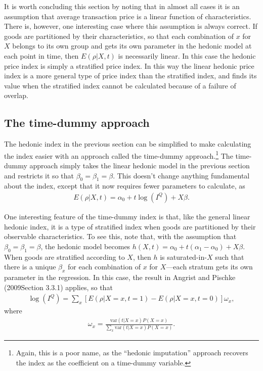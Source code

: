 \documentclass[
]{article}
\begin{document}
It is worth concluding this section by noting that in almost all cases it is an assumption that average transaction price is a linear function of characteristics. There is, however, one interesting case where this assumption is always correct. If goods are partitioned by their characteristics, so that each combination of \(x\) for \(X\) belongs to its own group and gets its own parameter in the hedonic model at each point in time, then \(E(\rho | X, t)\) is necessarily linear. In this case the hedonic price index is simply a stratified price index. In this way the linear hedonic price index is a more general type of price index than the stratified index, and finds its value when the stratified index cannot be calculated because of a failure of overlap.

\hypertarget{the-time-dummy-approach}{%
\subsection{The time-dummy approach}\label{the-time-dummy-approach}}

The hedonic index in the previous section can be simplified to make calculating the index easier with an approach called the time-dummy approach.\footnote{Again, this is a poor name, as the ``hedonic imputation'' approach recovers the index as the coefficient on a time-dummy variable.} The time-dummy approach simply takes the linear hedonic model in the previous section and restricts it so that \(\beta_{0} = \beta_{1} = \beta\). This doesn't change anything fundamental about the index, except that it now requires fewer parameters to calculate, as
\begin{align*}
E(\rho | X, t) = \alpha_{0} + t \log(I^{Q}) + X \beta.
\end{align*}

One interesting feature of the time-dummy index is that, like the general linear hedonic index, it is a type of stratified index when goods are partitioned by their observable characteristics. To see this, note that, with the assumption that \(\beta_{0} = \beta_{1} = \beta\), the hedonic model becomes \(h(X, t) = \alpha_{0} + t (\alpha_{1} - \alpha_{0}) + X\beta\). When goods are stratified according to \(X\), then \(h\) is saturated-in-\(X\) such that there is a unique \(\beta_x\) for each combination of \(x\) for \(X\)---each stratum gets its own parameter in the regression. In this case, the result in Angrist and Pischke (2009Section 3.3.1) applies, so that
\begin{align*}
\log(I^{Q}) = \sum_{x}[E(\rho | X = x, t = 1) - E(\rho | X = x, t = 0)] \omega_{x},
\end{align*}
where
\begin{align*}
\omega_{x} = \frac{\text{var}(t | X = x) P(X = x)}{\sum_{x} \text{var}(t | X = x) P(X = x)}.
\end{align*}
\end{document}
